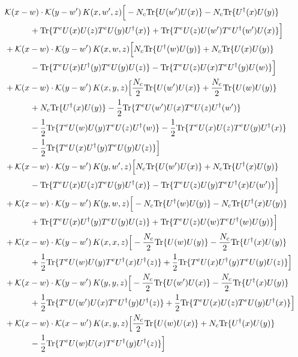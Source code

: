 \documentclass[10pt]{article}
\numberwithin{equation}{section}
\begin{document}
\begin{align}
&\mathcal K(x-w)\cdot\mathcal K(y-w')\,K(x,w',z)\Big[-N_c{\rm Tr}\{U(w')U(x)\}-N_c{\rm Tr}\{U^\dagger(x)U(y)\}\notag\\
&\quad\quad\quad+{\rm Tr}\{T^eU(x)U(z)T^eU(y)U^\dagger(x)\}+{\rm Tr}\{T^eU(z)U(w')T^eU^\dagger(w')U(x)\}\Big]\notag\\
&+\mathcal K(x-w)\cdot\mathcal K(y-w')\,K(x,w,z)\Big[N_c{\rm Tr}\{U^\dagger(w)U(y)\}+N_c{\rm Tr}\{U(x)U(y)\}\notag\\
&\quad\quad\quad-{\rm Tr}\{T^eU(x)U^\dagger(y)T^eU(y)U(z)\}-{\rm Tr}\{T^eU(z)U(x)T^eU^\dagger(y)U(w)\}\Big]\notag\\
&+\mathcal K(x-w)\cdot\mathcal K(y-w')\,K(x,y,z)\Big[\frac{N_c}{2}{\rm Tr}\{U(w')U(x)\}+\frac{N_c}{2}{\rm Tr}\{U(w)U(y)\}\notag\\
&\quad\quad\quad+N_c{\rm Tr}\{U^\dagger(x)U(y)\}-\frac{1}{2}{\rm Tr}\{T^eU(w')U(x)T^eU(z)U^\dagger(w')\}\notag\\
&\quad\quad\quad-\frac{1}{2}{\rm Tr}\{T^eU(w)U(y)T^eU(z)U^\dagger(w)\}-\frac{1}{2}{\rm Tr}\{T^eU(x)U(z)T^eU(y)U^\dagger(x)\}\notag\\
&\quad\quad\quad-\frac{1}{2}{\rm Tr}\{T^eU(x)U^\dagger(y)T^eU(y)U(z)\}\Big]\notag\\
&+\mathcal K(x-w)\cdot\mathcal K(y-w')\,K(y,w',z)\Big[N_c{\rm Tr}\{U(w')U(x)\}+N_c{\rm Tr}\{U^\dagger(x)U(y)\}\notag\\
&\quad\quad\quad-{\rm Tr}\{T^eU(x)U(z)T^eU(y)U^\dagger(x)\}-{\rm Tr}\{T^eU(z)U(y)T^eU^\dagger(x)U(w')\}\Big]\notag\\
&+\mathcal K(x-w)\cdot\mathcal K(y-w')\,K(y,w,z)\Big[-N_c{\rm Tr}\{U^\dagger(w)U(y)\}-N_c{\rm Tr}\{U^\dagger(x)U(y)\}\notag\\
&\quad\quad\quad+{\rm Tr}\{T^eU(x)U^\dagger(y)T^eU(y)U(z)\}+{\rm Tr}\{T^eU(z)U(w)T^eU^\dagger(w)U(y)\}\Big]\notag\\
&+\mathcal K(x-w)\cdot\mathcal K(y-w')\,K(x,x,z)\Big[-\frac{N_c}{2}{\rm Tr}\{U(w)U(y)\}-\frac{N_c}{2}{\rm Tr}\{U^\dagger(x)U(y)\}\notag\\
&\quad\quad\quad+\frac{1}{2}{\rm Tr}\{T^eU(w)U(y)T^eU^\dagger(x)U^\dagger(z)\}+\frac{1}{2}{\rm Tr}\{T^eU(x)U^\dagger(y)T^eU(y)U(z)\}\Big]\notag\\
&+\mathcal K(x-w)\cdot\mathcal K(y-w')\,K(y,y,z)\Big[-\frac{N_c}{2}{\rm Tr}\{U(w')U(x)\}-\frac{N_c}{2}{\rm Tr}\{U^\dagger(x)U(y)\}\notag\\
&\quad\quad\quad+\frac{1}{2}{\rm Tr}\{T^eU(w')U(x)T^eU^\dagger(y)U^\dagger(z)\}+\frac{1}{2}{\rm Tr}\{T^eU(x)U(z)T^eU(y)U^\dagger(x)\}\Big]\notag\\
&+\mathcal K(x-w)\cdot\mathcal K(x-w')\,K(x,y,z)\Big[\frac{N_c}{2}{\rm Tr}\{U(w)U(x)\}+N_c{\rm Tr}\{U^\dagger(x)U(y)\}\notag\\
&\quad\quad\quad-\frac{1}{2}{\rm Tr}\{T^eU(w)U(x)T^eU^\dagger(y)U^\dagger(z)\}\Big]
\label{eq:list16}
\end{align}
\end{document}

